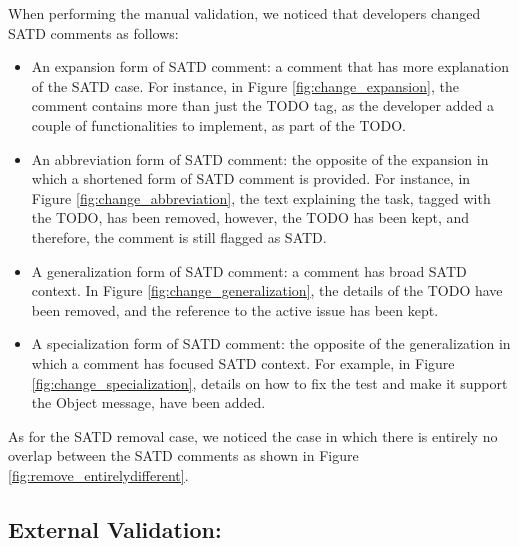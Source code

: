 \documentclass[3p]{elsarticle}
\begin{document}
When performing the manual validation, we noticed that developers changed SATD comments  as follows:
\begin{itemize}
    \item An expansion form of SATD comment: a comment that has more explanation of the SATD case. For instance, in Figure \ref{fig:change_expansion}, the comment contains more than just the TODO tag, as the developer added a couple of functionalities to implement, as part of the TODO.
    \item An abbreviation form of SATD comment: the opposite of the expansion in which a shortened form of SATD comment is provided. For instance, in Figure \ref{fig:change_abbreviation}, the text explaining the task, tagged with the TODO, has been removed, however, the TODO has been kept, and therefore, the comment is still flagged as SATD. 
    \item A generalization form of SATD comment: a comment has broad SATD context.  In Figure \ref{fig:change_generalization}, the details of the TODO have been removed, and the reference to the active issue has been kept.
    \item A specialization form of SATD comment: the opposite of the generalization in which a comment has focused SATD context. For example, in Figure \ref{fig:change_specialization}, details on how to fix the test and make it support the Object message, have been added. 
\end{itemize}
As for the SATD removal case, we noticed the case in which there is entirely no overlap between the SATD comments as shown in Figure \ref{fig:remove_entirelydifferent}. 

 \subsection{External Validation:}
 
\end{document}

